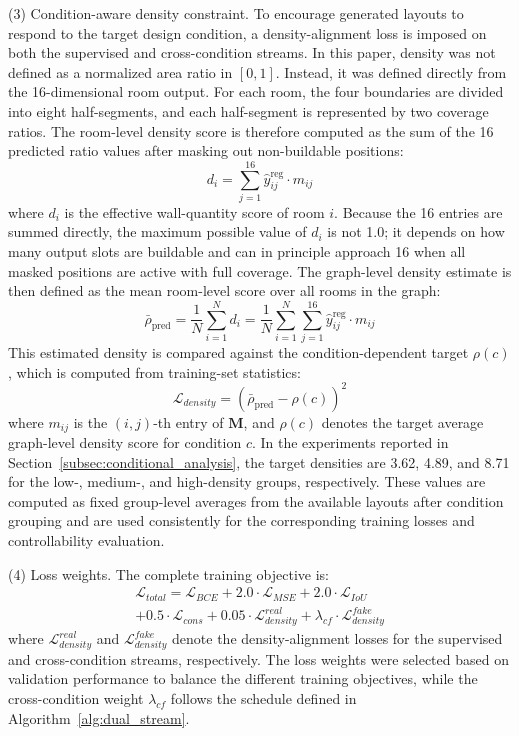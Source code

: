 (3) Condition-aware density constraint. To encourage generated layouts to respond to the target design condition, a density-alignment loss is imposed on both the supervised and cross-condition streams.
In this paper, density was not defined as a normalized area ratio in $[0,1]$. Instead, it was defined directly from the 16-dimensional room output. For each room, the four boundaries are divided into eight half-segments, and each half-segment is represented by two coverage ratios. The room-level density score is therefore computed as the sum of the 16 predicted ratio values after masking out non-buildable positions:
\begin{equation}
d_i = \sum_{j=1}^{16}\hat{y}_{ij}^{\text{reg}} \cdot m_{ij}
\label{eq:room_density}
\end{equation}
where $d_i$ is the effective wall-quantity score of room $i$. Because the 16 entries are summed directly, the maximum possible value of $d_i$ is not 1.0; it depends on how many output slots are buildable and can in principle approach 16 when all masked positions are active with full coverage.
The graph-level density estimate is then defined as the mean room-level score over all rooms in the graph:
\begin{equation}
\bar{\rho}_{\text{pred}} = \frac{1}{N}\sum_{i=1}^{N} d_i
= \frac{1}{N}\sum_{i=1}^{N}\sum_{j=1}^{16}\hat{y}_{ij}^{\text{reg}} \cdot m_{ij}
\label{eq:graph_density}
\end{equation}
This estimated density is compared against the condition-dependent target $\rho(c)$, which is computed from training-set statistics:
\begin{equation}
\mathcal{L}_{density} = \left(\bar{\rho}_{\text{pred}} - \rho(c)\right)^2
\label{eq:loss_density}
\end{equation}
where $m_{ij}$ is the $(i,j)$-th entry of $\mathbf{M}$, and $\rho(c)$ denotes the target average graph-level density score for condition $c$. In the experiments reported in Section~\ref{subsec:conditional_analysis}, the target densities are 3.62, 4.89, and 8.71 for the low-, medium-, and high-density groups, respectively. These values are computed as fixed group-level averages from the available layouts after condition grouping and are used consistently for the corresponding training losses and controllability evaluation.

(4) Loss weights. The complete training objective is:
\begin{multline}
\mathcal{L}_{total} = \mathcal{L}_{BCE} + 2.0 \cdot \mathcal{L}_{MSE} + 2.0 \cdot \mathcal{L}_{IoU} \\
+ 0.5 \cdot \mathcal{L}_{cons} + 0.05 \cdot \mathcal{L}_{density}^{real} + \lambda_{cf} \cdot \mathcal{L}_{density}^{fake}
\end{multline}
where $\mathcal{L}_{density}^{real}$ and $\mathcal{L}_{density}^{fake}$ denote the density-alignment losses for the supervised and cross-condition streams, respectively. The loss weights were selected based on validation performance to balance the different training objectives, while the cross-condition weight $\lambda_{cf}$ follows the schedule defined in Algorithm~\ref{alg:dual_stream}.


